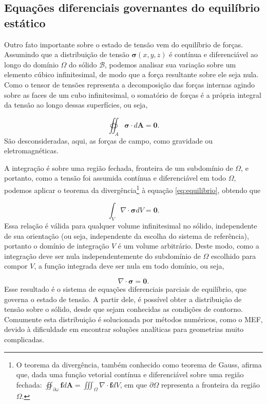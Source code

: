 

\subsection{Equações diferenciais governantes do equilíbrio estático}

Outro fato importante sobre o estado de tensão vem do equilíbrio de forças. Assumindo que a distribuição de tensão $\bm{\sigma}(x,y,z)$ é contínua e diferenciável ao longo do domínio $\Omega$ do sólido $\mathcal{B}$, podemos analisar sua variação sobre um elemento cúbico infinitesimal, de modo que a força resultante sobre ele seja nula. Como o tensor de tensões representa a decomposição das forças internas agindo sobre as faces de um cubo infinitesimal, o somatório de forças é a própria integral da tensão ao longo dessas superfícies, ou seja,

\begin{equation}
    \oiint_A \bm{\sigma} \cdot d\bm{A} = \bm{0}.
    \label{eq:equilibrio}
\end{equation}
São desconsideradas, aqui, as forças de campo, como gravidade ou eletromagnéticas. \cite[pág. 4, The Equilibrium Equations]{roylance}

A integração é sobre uma região fechada, fronteira de um subdomínio de $\Omega$, e portanto, como a tensão foi assumida contínua e diferenciável em todo $\Omega$, podemos aplicar o teorema da divergência\footnote{O teorema da divergência, também conhecido como teorema de Gauss, afirma que, dada uma função vetorial contínua e diferenciável sobre uma região fechada: $ \oiint_{\partial \omega} \bm{f} d\bm{A} = \iiint_{\Omega} \nabla \cdot \bm{f} dV$, em que $\partial \Omega$ representa a fronteira da região $\Omega$.} à equação \ref{eq:equilibrio}, obtendo que

\begin{equation}
    \int_V \nabla \cdot \bm{\sigma} dV = \bm{0}.
\end{equation}
Essa relação é válida para qualquer volume infinitesimal no sólido, independente de sua orientação (ou seja, independente da escolha do sistema de referência), portanto o domínio de integração $V$ é um volume arbitrário. Deste modo, como a integração deve ser nula independentemente do subdomínio de $\Omega$ escolhido para compor $V$, a função integrada deve ser nula em todo domínio, ou seja,

\begin{equation}
    \nabla \cdot \bm{\sigma} = \bm{0}.
\end{equation}
Esse resultado é o sistema de equações diferenciais parciais de equilíbrio, que governa o estado de tensão. A partir dele, é possível obter a distribuição de tensão sobre o sólido, desde que sejam conhecidas as condições de contorno. Comumente esta distribuição é solucionada por métodos numéricos, como o MEF, devido à dificuldade em encontrar soluções analíticas para geometrias muito complicadas. 

